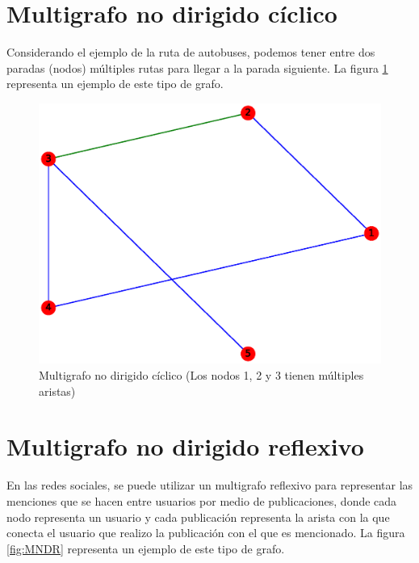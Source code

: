 \documentclass{article}
\begin{document}
\section{Multigrafo no dirigido cíclico}
Considerando el ejemplo de la ruta de autobuses, podemos tener entre dos paradas (nodos) múltiples rutas para llegar a la parada siguiente. La figura \ref{fig:MNDC} representa un ejemplo de este tipo de grafo.
\begin{figure}[H]
    \includegraphics[width=\textwidth]{8-MNDC}
    \caption{Multigrafo no dirigido cíclico (Los nodos 1, 2 y 3 tienen múltiples aristas)}
    \label{fig:MNDC}
\end{figure}



\section{Multigrafo no dirigido reflexivo}
En las redes sociales, se puede utilizar un multigrafo reflexivo para representar las menciones que se hacen entre usuarios por medio de publicaciones, donde cada nodo representa un usuario y cada publicación representa la arista con la que conecta el usuario que realizo la publicación con el que es mencionado. La figura \ref{fig:MNDR} representa un ejemplo de este tipo de grafo.
\end{document}
